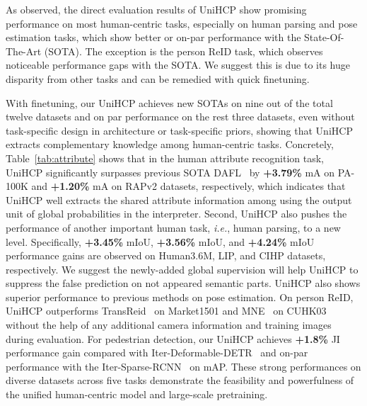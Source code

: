 \documentclass[10pt,twocolumn,letterpaper]{article}
\begin{document}
As observed, the direct evaluation results of UniHCP show promising performance on most human-centric tasks, especially on human parsing and pose estimation tasks, which show better or on-par performance with the State-Of-The-Art (SOTA). The exception is the person ReID task, which observes noticeable performance gaps with the SOTA. We suggest this is due to its huge disparity from other tasks and can be remedied with quick finetuning.

With finetuning, our UniHCP achieves new SOTAs on nine out of the total twelve datasets and on par performance on the rest three datasets, even without task-specific design in architecture or task-specific priors, showing that UniHCP extracts complementary knowledge among human-centric tasks.
Concretely, Table~\ref{tab:attribute} shows that in the human attribute recognition task, UniHCP significantly surpasses previous SOTA DAFL~\cite{jia2022learning} by \textbf{+3.79\%} mA on PA-100K and \textbf{+1.20\%} mA on RAPv2 datasets, respectively, which indicates that UniHCP well extracts the shared attribute information among using the output unit of global probabilities in the interpreter. Second, UniHCP also pushes the performance of another important human task, \emph{i.e.}, human parsing, to a new level. Specifically, \textbf{+3.45\%} mIoU, \textbf{+3.56\%} mIoU, and \textbf{+4.24\%} mIoU performance gains are observed on Human3.6M, LIP, and CIHP datasets, respectively. We suggest the newly-added global supervision {} will help UniHCP to suppress the false prediction on not appeared semantic parts. UniHCP also shows superior performance to previous methods on pose estimation. On person ReID, UniHCP outperforms TransReid~\cite{he2021transreid} on Market1501 and MNE~\cite{li2019memory} on CUHK03 without the help of any additional camera information and training images during evaluation. For pedestrian detection, our UniHCP achieves \textbf{+1.8\%} JI performance gain compared with Iter-Deformable-DETR~\cite{zheng2022progressive} and on-par performance with the Iter-Sparse-RCNN~\cite{zheng2022progressive} on mAP. These strong performances on diverse datasets across five tasks demonstrate the feasibility and powerfulness of the unified human-centric model and large-scale pretraining. 
\end{document}
